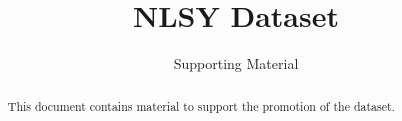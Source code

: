 

\title{NLSY Dataset}
\subtitle{Supporting Material}
\date{}

\maketitle\vspace{-2cm}

\begin{abstract}
\noindent This document contains material to support the promotion of the dataset.
\end{abstract}\vspace{1cm}

\tableofcontents\newpage\listoffigures



\clearpage



